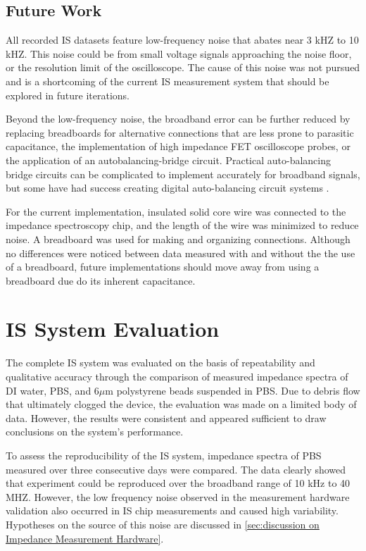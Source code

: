 \subsection*{Future Work}

\par All recorded IS datasets feature low-frequency noise that abates near 3 kHZ to 10 kHZ. This noise could be from small voltage signals approaching the noise floor, or the resolution limit of the oscilloscope. The cause of this noise was not pursued and is a shortcoming of the current IS measurement system that should be explored in future iterations.

\par Beyond the low-frequency noise, the broadband error can be further reduced by replacing breadboards for alternative connections that are less prone to parasitic capacitance, the implementation of high impedance FET oscilloscope probes, or the application of an autobalancing-bridge circuit. Practical auto-balancing bridge circuits can be complicated to implement accurately for broadband signals, but some have had success creating digital auto-balancing circuit systems \cite{li_high-speed_2013}.

\par For the current implementation, insulated solid core wire was connected to the impedance spectroscopy chip, and the length of the wire was minimized to reduce noise. A breadboard was used for making and organizing connections. Although no differences were noticed between data measured with and without the the use of a breadboard, future implementations should move away from using a breadboard due do its inherent capacitance.

\section{IS System Evaluation}

\par The complete IS system was evaluated on the basis of repeatability and qualitative accuracy through the comparison of measured impedance spectra of DI water, PBS, and 6$\mu$m polystyrene beads suspended in PBS. Due to debris flow that ultimately clogged the device, the evaluation was made on a limited body of data. However, the results were consistent and appeared sufficient to draw conclusions on the system's performance.

\par To assess the reproducibility of the IS system, impedance spectra of PBS measured over three consecutive days were compared. The data clearly showed that experiment could be reproduced over the broadband range of 10 kHz to 40 MHZ. However, the low frequency noise observed in the measurement hardware validation also occurred in IS chip measurements and caused high variability. Hypotheses on the source of this noise are discussed in \ref{sec:discussion on Impedance Measurement Hardware}.

